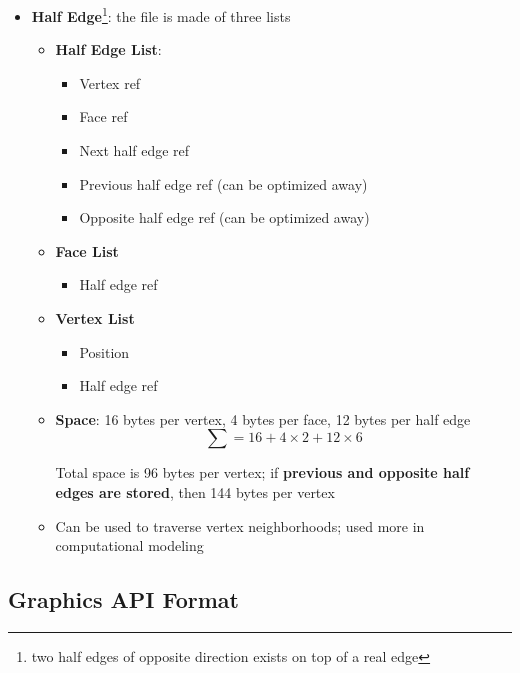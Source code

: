 \begin{itemize}
    \item \textbf{Half Edge}\footnote{two half edges of opposite direction
    exists on top of a real edge}: the file is made of three lists
    \begin{itemize}
      \item \textbf{Half Edge List}:
      \begin{itemize}
        \item Vertex ref
        \item Face ref
        \item Next half edge ref
        \item Previous half edge ref (can be optimized away)
        \item Opposite half edge ref (can be optimized away)
      \end{itemize}

      \item \textbf{Face List}
      \begin{itemize}
        \item Half edge ref
      \end{itemize}

      \item \textbf{Vertex List}
      \begin{itemize}
        \item Position
        \item Half edge ref
      \end{itemize}

      \item \textbf{Space}: 16 bytes per vertex, 4 bytes per face, 12 bytes
      per half edge
      \begin{equation}
        \sum = 16 + 4 \times 2 + 12 \times 6
      \end{equation}

      Total space is 96 bytes per vertex; if \textbf{previous and opposite
      half edges are stored}, then 144 bytes per vertex

      \item Can be used to traverse vertex neighborhoods; used more in
      computational modeling
    \end{itemize}
  \end{itemize}

\subsection{Graphics API Format}

